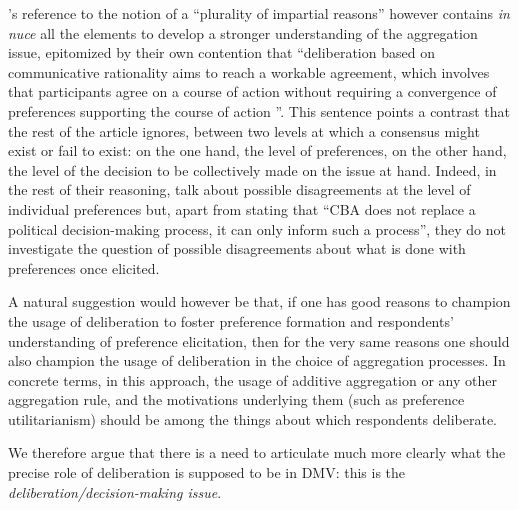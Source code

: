 \documentclass[version=3.21, pagesize, twoside=off, bibliography=totoc, DIV=calc, fontsize=12pt, a4paper, french, english]{scrartcl}
\begin{document}
\citeauthor{bartkowski_beyond_2018}'s reference to the notion of a ``plurality of impartial reasons'' however contains \emph{in nuce} all the elements to develop a stronger understanding of the aggregation issue, epitomized by their own contention that ``deliberation based on communicative rationality aims to reach a workable agreement, which involves that participants agree on a course of action without requiring a convergence of preferences supporting the course of action \citep{dryzek_deliberative_2002}''. 
This sentence points a contrast that the rest of the article ignores, between two levels at which a consensus might exist or fail to exist: on the one hand,  the level of preferences, on the other hand, the level of the decision to be collectively made on the issue at hand. 
Indeed, in the rest of their reasoning, \citeauthor{bartkowski_beyond_2018} talk about possible disagreements at the level of individual preferences but, apart from stating that ``CBA  does not replace a political decision-making process, it can only inform such a process'', they do not investigate  the question of possible disagreements about what is done with preferences once elicited.  

A natural suggestion would however be that, if one has good reasons to champion the usage of deliberation to foster preference formation and respondents' understanding of preference elicitation, then for the very same reasons one should also champion the usage of deliberation in the choice of aggregation processes. 
In concrete terms, in this approach, the usage of additive aggregation or any other aggregation rule, and the motivations underlying them (such as preference utilitarianism) should be among the things about which respondents deliberate.

We therefore argue that there is a need to articulate much more clearly what the precise role of deliberation is supposed to be in DMV: this is the \emph{deliberation/decision-making issue}.
\end{document}
